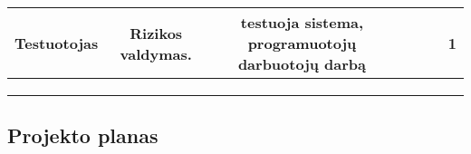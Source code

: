 \documentclass[a4paper,12pt]{article}
\begin{document}
\begin{frame}
\begin{tabular}{ccccccc}
\multicolumn{1}{|c|}{Testuotojas}          & \multicolumn{1}{c|}{Rizikos valdymas.}                       & \multicolumn{1}{c|}{testuoja sistema, programuotojų darbuotojų darbą}                                                                            & \multicolumn{1}{c|}{}        & \multicolumn{1}{c|}{}       & \multicolumn{1}{c|}{}       & \multicolumn{1}{c|}{1}           \\ \hline
\multicolumn{1}{|c|}{}                     & \multicolumn{1}{c|}{}                                        & \multicolumn{1}{c|}{}                                                                                                                            & \multicolumn{1}{c|}{}        & \multicolumn{1}{c|}{}       & \multicolumn{1}{c|}{}       & \multicolumn{1}{c|}{}            \\ \hline
\multicolumn{1}{|l|}{}                     & \multicolumn{1}{l|}{}                                        & \multicolumn{1}{l|}{}                                                                                                                            & \multicolumn{1}{l|}{}        & \multicolumn{1}{l|}{}       & \multicolumn{1}{l|}{}       & \multicolumn{1}{l|}{}            \\ \hline
\multicolumn{1}{l}{}                       & \multicolumn{1}{l}{}                                         & \multicolumn{1}{l}{}                                                                                                                             & \multicolumn{1}{l}{}         & \multicolumn{1}{l}{}        & \multicolumn{1}{l}{}        & \multicolumn{1}{l}{}            
\end{tabular}
\end{frame}


\subsection{Projekto planas}
\end{document}
